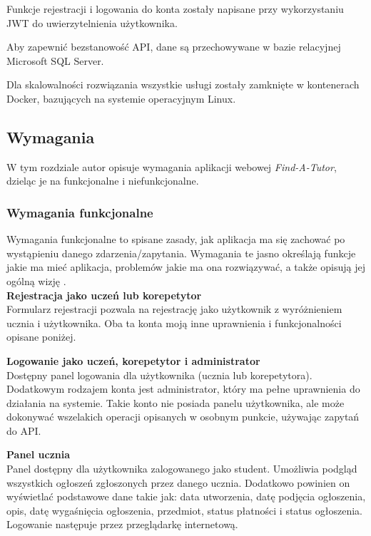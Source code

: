 \documentclass[12pt]{article}
\numberwithin{figure}{section}
\begin{document}
\begin{sloppypar}
Funkcje rejestracji i logowania do konta zostały napisane przy wykorzystaniu JWT do uwierzytelnienia użytkownika.

Aby zapewnić bezstanowość API, dane są przechowywane w bazie relacyjnej Microsoft SQL Server.

Dla skalowalności rozwiązania wszystkie usługi zostały zamknięte w kontenerach Docker, bazujących na systemie operacyjnym Linux.

\subsection{Wymagania}
W tym rozdziale autor opisuje wymagania aplikacji webowej \textit{Find-A-Tutor}, dzieląc je na funkcjonalne i niefunkcjonalne. 

\subsubsection{Wymagania funkcjonalne}
Wymagania funkcjonalne to spisane zasady, jak aplikacja ma się zachować po wystąpieniu danego zdarzenia/zapytania. Wymagania te jasno określają funkcje jakie ma mieć aplikacja, problemów jakie ma ona rozwiązywać, a także opisują jej ogólną wizję \cite{funkcjonalne}. \\
\noindent
\textbf{Rejestracja jako uczeń lub korepetytor}\\
\indent
Formularz rejestracji pozwala na rejestrację jako użytkownik z wyróżnieniem ucznia i użytkownika. Oba ta konta moją inne uprawnienia i funkcjonalności opisane poniżej.

\noindent
\textbf{Logowanie jako uczeń, korepetytor i administrator}\\
\indent  
Dostępny panel logowania dla użytkownika (ucznia lub korepetytora). Dodatkowym rodzajem konta jest administrator, który ma pełne uprawnienia do działania na systemie. Takie konto nie posiada panelu użytkownika, ale może dokonywać wszelakich operacji opisanych w osobnym punkcie, używając zapytań do API.

\noindent
\textbf{Panel ucznia}\\
\indent
Panel dostępny dla użytkownika zalogowanego jako student. Umożliwia podgląd wszystkich ogłoszeń zgłoszonych przez danego ucznia. Dodatkowo powinien on wyświetlać podstawowe dane takie jak: data utworzenia, datę podjęcia ogłoszenia, opis, datę wygaśnięcia ogłoszenia, przedmiot, status płatności i status ogłoszenia. Logowanie następuje przez przeglądarkę internetową. 


\end{sloppypar}
\end{document}
